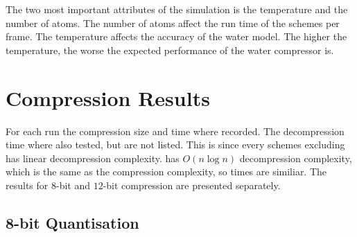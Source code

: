 \documentclass[a4paper]{report}
\begin{document}
The two most important attributes of the simulation is the temperature and the
number of atoms. The number of atoms affect the run time of the schemes per
frame. The temperature affects the accuracy of the water model. The higher the
temperature, the worse the expected performance of the water compressor is.

\section{Compression Results}

For each run the compression size and time where recorded. The decompression
time where also tested, but are not listed. This is since every schemes
excluding \citet{devillers2000gci} has linear decompression
complexity. \citet{devillers2000gci} has $O(n \log n)$ decompression
complexity, which is the same as the compression complexity, so times are
similiar. The results for $8$-bit and $12$-bit compression are presented
separately.

\subsection{8-bit Quantisation}
\end{document}

